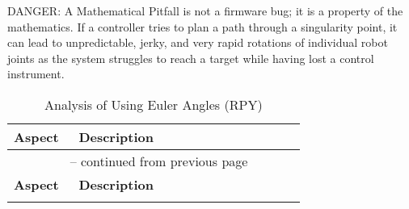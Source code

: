 \begin{dangerbox}{DANGER: A Mathematical Pitfall}
 is not a firmware bug; it is a property of the mathematics. If a controller tries to plan a path through a singularity point, it can lead to unpredictable, jerky, and very rapid rotations of individual robot joints as the system struggles to reach a target while having lost a control instrument.
\end{dangerbox}

\renewcommand{\arraystretch}{1.2} %
\begin{longtable}{p{0.2\linewidth} p{0.7\linewidth}}
    \caption{Analysis of Using Euler Angles (RPY)}\label{tab:euler_angles_analysis}\\
    \toprule %
    \textbf{Aspect} & \textbf{Description} \\
    \toprule %
    \endfirsthead

    \multicolumn{2}{c}{\tablename~\thetable{} -- continued from previous page} \\
    \toprule %
    \textbf{Aspect} & \textbf{Description} \\
    \toprule %
    \endhead

    \bottomrule %
    \endfoot

    \bottomrule %
    \endlastfoot


\end{longtable}

